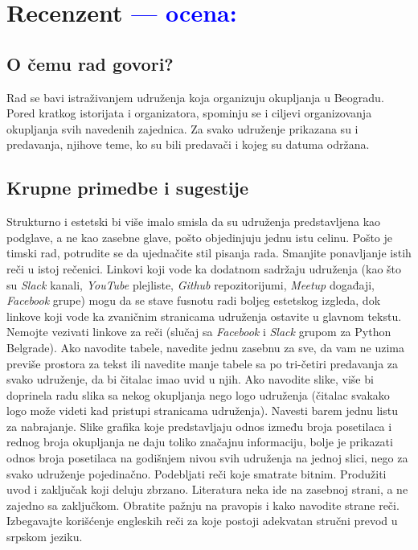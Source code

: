 \documentclass[a4paper]{report}
\newcommand{\odgovor}[1]{\textcolor{blue}{#1}}
\begin{document}
\chapter{Recenzent \odgovor{--- ocena:} }


\section{O čemu rad govori?}
Rad se bavi istraživanjem udruženja koja organizuju okupljanja u Beogradu. 
Pored kratkog istorijata i organizatora, spominju se i ciljevi organizovanja 
okupljanja svih navedenih zajednica. Za svako udruženje prikazana su i predavanja, 
njihove teme, ko su bili predavači i kojeg su datuma održana.

\section{Krupne primedbe i sugestije}
Strukturno i estetski bi više imalo smisla da su udruženja predstavljena kao podglave, 
a ne kao zasebne glave, pošto objedinjuju jednu istu celinu.
Pošto je timski rad, potrudite se da ujednačite stil pisanja rada.
Smanjite ponavljanje istih reči u istoj rečenici.
Linkovi koji vode ka dodatnom sadržaju udruženja (kao što su \textit{Slack} kanali, \textit{YouTube} plejliste, \textit{Github} repozitorijumi, 
\textit{Meetup} događaji, \textit{Facebook} grupe) mogu da se stave fusnotu radi boljeg estetskog izgleda, dok
linkove koji vode ka zvaničnim stranicama udruženja ostavite u glavnom tekstu. 
Nemojte vezivati linkove za reči (slučaj sa \textit{Facebook} i \textit{Slack} grupom za Python Belgrade). 
Ako navodite tabele, navedite jednu zasebnu za sve, da vam ne uzima previše prostora za tekst ili
navedite manje tabele sa po tri-četiri predavanja za svako udruženje, da bi čitalac imao uvid u njih.
Ako navodite slike, više bi doprinela radu slika sa nekog okupljanja nego logo 
udruženja (čitalac svakako logo može videti kad pristupi stranicama udruženja).
Navesti barem jednu listu za nabrajanje. Slike grafika koje predstavljaju odnos između broja posetilaca
i rednog broja okupljanja ne daju toliko značajnu informaciju, bolje je prikazati odnos broja posetilaca na
godišnjem nivou svih udruženja na jednoj slici, nego za svako udruženje pojedinačno.
Podebljati reči koje smatrate bitnim. Produžiti uvod i zaključak koji deluju zbrzano. 
Literatura neka ide na zasebnoj strani, a ne zajedno sa zaključkom.
Obratite pažnju na pravopis i kako navodite strane reči.
Izbegavajte korišćenje engleskih reči za koje postoji adekvatan stručni prevod u srpskom jeziku.
\end{document}
